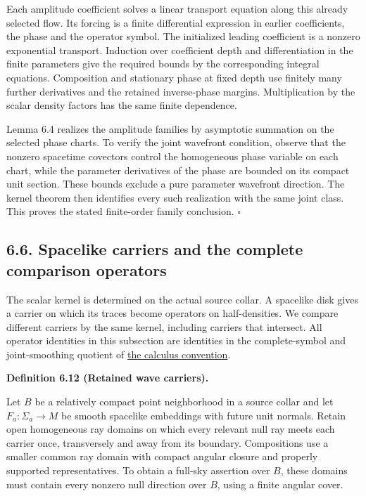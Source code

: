 \documentclass[
  english,
  11pt,
  reqno]{amsart}
\makeatletter
\newcommand{\pandocstatementheading}[1]{%
  \par\addpenalty{\@beginparpenalty}%
  \addvspace{.5\baselineskip plus .2\baselineskip minus .2\baselineskip}%
  {\normalfont\bfseries #1\par}%
  \nobreak\@afterindenttrue\@afterheading
}
\makeatother
\begin{document}
Each amplitude coefficient solves a linear transport equation along this
already selected flow. Its forcing is a finite differential expression
in earlier coefficients, the phase and the operator symbol. The
initialized leading coefficient is a nonzero exponential transport.
Induction over coefficient depth and differentiation in the finite
parameters give the required bounds by the corresponding integral
equations. Composition and stationary phase at fixed depth use finitely
many further derivatives and the retained inverse-phase margins.
Multiplication by the scalar density factors has the same finite
dependence.

Lemma 6.4 realizes the amplitude families by asymptotic summation on the
selected phase charts. To verify the joint wavefront condition, observe
that the nonzero spacetime covectors control the homogeneous phase
variable on each chart, while the parameter derivatives of the phase are
bounded on its compact unit section. These bounds exclude a pure
parameter wavefront direction. The kernel theorem then identifies every
such realization with the same joint class. This proves the stated
finite-order family conclusion. \hfill\(\square\)

\subsection{6.6. Spacelike carriers and the complete comparison
operators}\label{spacelike-carriers-and-the-complete-comparison-operators}\label{sec:online-wave-carriers}

The scalar kernel is determined on the actual source collar. A spacelike
disk gives a carrier on which its traces become operators on
half-densities. We compare different carriers by the same kernel,
including carriers that intersect. All operator identities in this
subsection are identities in the complete-symbol and joint-smoothing
quotient of \hyperref[def:online-complete-symbol-calculus]{the calculus
convention}.

\pandocstatementheading{\leavevmode{}\label{def:online-wave-carrier-displays}Definition 6.12 (Retained wave carriers).}

Let \(B\) be a relatively compact point neighborhood in a source collar
and let \(F_a:\Sigma_a\to M\) be smooth spacelike embeddings with future
unit normals. Retain open homogeneous ray domains on which every
relevant null ray meets each carrier once, transversely and away from
its boundary. Compositions use a smaller common ray domain with compact
angular closure and properly supported representatives. To obtain a
full-sky assertion over \(B\), these domains must contain every nonzero
null direction over \(B\), using a finite angular cover.
\end{document}
